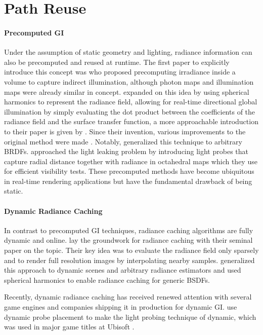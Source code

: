 \section{Path Reuse}

\paragraph{Precomputed GI}
Under the assumption of static geometry and lighting, radiance information can also be precomputed and reused at runtime.
The first paper to explicitly introduce this concept was \textcite{greger1998} who proposed precomputing irradiance inside a volume to capture indirect illumination, although photon maps  and illumination maps  were already similar in concept.
\textcite{sloan2002} expanded on this idea by using spherical harmonics to represent the radiance field, allowing for real-time directional global illumination by simply evaluating the dot product between the coefficients of the radiance field and the surface transfer function, a more approachable introduction to their paper is given by \textcite{green2003}.
Since their invention, various improvements to the original method were made .
Notably, \textcite{kautz2002} generalized this technique to arbitrary BRDFs.
\textcite{mcguire2017} approached the light leaking problem by introducing light probes that capture radial distance together with radiance in octahedral maps  which they use for efficient visibility tests.
These precomputed methods have become ubiquitous in real-time rendering applications  but have the fundamental drawback of being static.

\paragraph{Dynamic Radiance Caching}
In contrast to precomputed GI techniques, radiance caching algorithms are fully dynamic and online.
\textcite{ward1988} lay the groundwork for radiance caching with their seminal paper on the topic.
Their key idea was to evaluate the radiance field only sparsely and to render full resolution images by interpolating nearby samples.
\textcite{tole2002} generalized this approach to dynamic scenes and arbitrary radiance estimators and \textcite{krivanek2005} used spherical harmonics to enable radiance caching for generic BSDFs.

Recently, dynamic radiance caching has received renewed attention with several game engines and companies shipping it in production for dynamic GI.
\textcite{majercik2019} use dynamic probe placement to make the light probing technique of \textcite{mcguire2017} dynamic, which was used in major game titles at Ubisoft .

